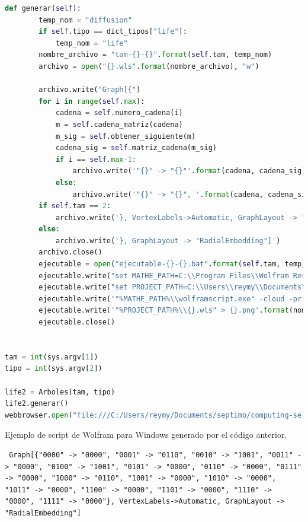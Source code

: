 \begin{lstlisting}[language=Python]
    def generar(self):
        temp_nom = "diffusion"
        if self.tipo == dict_tipos["life"]:
            temp_nom = "life"
        nombre_archivo = "tam-{}-{}".format(self.tam, temp_nom)
        archivo = open("{}.wls".format(nombre_archivo), "w")

        archivo.write("Graph[{")
        for i in range(self.max):
            cadena = self.numero_cadena(i)
            m = self.cadena_matriz(cadena)
            m_sig = self.obtener_siguiente(m)
            cadena_sig = self.matriz_cadena(m_sig)
            if i == self.max-1:
                archivo.write('"{}" -> "{}"'.format(cadena, cadena_sig))
            else:
                archivo.write('"{}" -> "{}", '.format(cadena, cadena_sig))
        if self.tam == 2:
            archivo.write('}, VertexLabels->Automatic, GraphLayout -> "RadialEmbedding"]')
        else:
            archivo.write('}, GraphLayout -> "RadialEmbedding"]')
        archivo.close()
        ejecutable = open("ejecutable-{}-{}.bat".format(self.tam, temp_nom), "w")
        ejecutable.write("set MATHE_PATH=C:\\Program Files\\Wolfram Research\\Mathematica\\11.3\n")
        ejecutable.write("set PROJECT_PATH=C:\\Users\\reymy\\Documents\\septimo\\computing-selected-topics\\arboles\n")
        ejecutable.write('"%MATHE_PATH%\\wolframscript.exe" -cloud -print -format PNG -file ')
        ejecutable.write('"%PROJECT_PATH%\\{}.wls" > {}.png'.format(nombre_archivo, nombre_archivo))
        ejecutable.close()


tam = int(sys.argv[1])
tipo = int(sys.argv[2])

life2 = Arboles(tam, tipo)
life2.generar()
webbrowser.open("file:///C:/Users/reymy/Documents/septimo/computing-selected-topics/arboles/index.html")

\end{lstlisting}

Ejemplo de script de Wolfram para Windows generado por el código anterior.
\begin{lstlisting}
 Graph[{"0000" -> "0000", "0001" -> "0110", "0010" -> "1001", "0011" -> "0000", "0100" -> "1001", "0101" -> "0000", "0110" -> "0000", "0111" -> "0000", "1000" -> "0110", "1001" -> "0000", "1010" -> "0000", "1011" -> "0000", "1100" -> "0000", "1101" -> "0000", "1110" -> "0000", "1111" -> "0000"}, VertexLabels->Automatic, GraphLayout -> "RadialEmbedding"]
\end{lstlisting}

